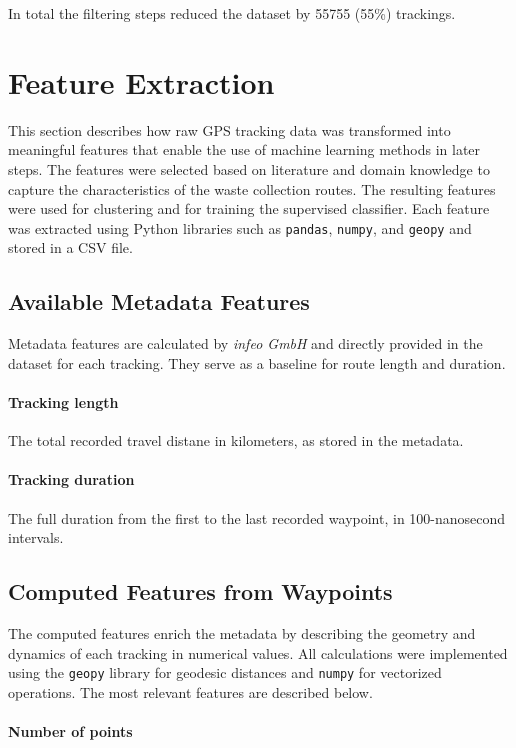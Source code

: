 \documentclass[a4paper,12pt,twoside]{scrreprt}
\begin{document}
In total the filtering steps reduced the dataset by 55755 (55\%) trackings.

\section{Feature Extraction}
This section describes how raw GPS tracking data was transformed into
meaningful features that enable the use of machine learning methods in later
steps.
The features were selected based on literature and domain knowledge to capture
the characteristics of the waste collection routes.
The resulting features were used for clustering and for training the supervised
classifier. Each feature was extracted using Python libraries such as
\texttt{pandas}, \texttt{numpy}, and \texttt{geopy} and stored in a CSV file.

\subsection{Available Metadata Features}
Metadata features are calculated by \textit{infeo GmbH} and directly provided
in the dataset for each tracking. They
serve as a
baseline for route length and duration.

\paragraph{Tracking length}
The total recorded travel distane in kilometers, as stored in the metadata.

\paragraph{Tracking duration}
The full duration from the first to the last recorded waypoint, in
100-nanosecond intervals.

\subsection{Computed Features from Waypoints}
The computed features enrich the metadata by describing the geometry and
dynamics of each
tracking in numerical values.
All calculations were implemented using the \texttt{geopy} library for geodesic
distances and \texttt{numpy} for vectorized operations.
The most relevant features are described below.

\paragraph{Number of points}
\end{document}

